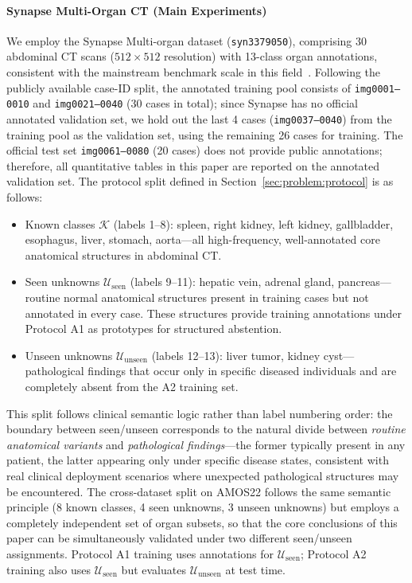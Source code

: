 \documentclass[3p,twocolumn,authoryear]{elsarticle}
\newcommand{\cK}{\mathcal{K}}                             %
\newcommand{\cU}{\mathcal{U}}                             %
\begin{document}
\paragraph{Synapse Multi-Organ CT (Main Experiments)}
We employ the Synapse Multi-organ dataset (\texttt{syn3379050}), comprising 30 abdominal
CT scans ($512 \times 512$ resolution) with 13-class organ annotations, consistent with
the mainstream benchmark scale in this field~\cite{chen2021transunet,cao2022swinunet}.
Following the publicly available case-ID split, the annotated training pool consists of
\texttt{img0001--0010} and \texttt{img0021--0040} (30 cases in total); since Synapse
has no official annotated validation set, we hold out the last 4 cases
(\texttt{img0037--0040}) from the training pool as the validation set, using the
remaining 26 cases for training.
The official test set \texttt{img0061--0080} (20 cases) does not provide public
annotations; therefore, all quantitative tables in this paper are reported on the
annotated validation set.
The protocol split defined in Section~\ref{sec:problem:protocol} is as follows:
\begin{itemize}[nosep]
  \item Known classes $\cK$ (labels 1--8): spleen, right kidney, left kidney,
        gallbladder, esophagus, liver, stomach, aorta---all high-frequency,
        well-annotated core anatomical structures in abdominal CT.
  \item Seen unknowns $\cU_{\text{seen}}$ (labels 9--11): hepatic vein, adrenal gland,
        pancreas---routine normal anatomical structures present in training cases but not
        annotated in every case. These structures provide training annotations under
        Protocol A1 as prototypes for structured abstention.
  \item Unseen unknowns $\cU_{\text{unseen}}$ (labels 12--13): liver tumor, kidney
        cyst---pathological findings that occur only in specific diseased individuals
        and are completely absent from the A2 training set.
\end{itemize}
This split follows clinical semantic logic rather than label numbering order:
the boundary between seen/unseen corresponds to the natural divide between
\emph{routine anatomical variants} and \emph{pathological findings}---the former
typically present in any patient, the latter appearing only under specific disease
states, consistent with real clinical deployment scenarios where unexpected pathological
structures may be encountered.
The cross-dataset split on AMOS22 follows the same semantic principle
(8 known classes, 4 seen unknowns, 3 unseen unknowns) but employs a completely
independent set of organ subsets, so that the core conclusions of this paper can be
simultaneously validated under two different seen/unseen assignments.
Protocol A1 training uses annotations for $\cU_{\text{seen}}$; Protocol A2 training
also uses $\cU_{\text{seen}}$ but evaluates $\cU_{\text{unseen}}$ at test time.
\end{document}
